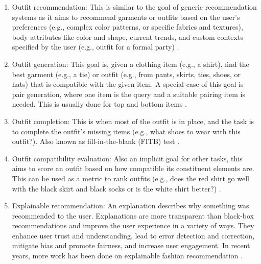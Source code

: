 		\begin{enumerate}
			\item Outfit recommendation: This is similar to the goal of generic recommendation systems as it aims to recommend garments or outfits based on the user's preferences (e.g., complex color patterns, or specific fabrics and textures), body attributes like color and shape, current trends, and custom contexts specified by the user (e.g., outfit for a formal party) \cite{DBLP:conf/sigir/LiW0CXC20, 9156794, 8932738, DBLP:conf/mm/HidayatiHCHFC18, DBLP:journals/tmm/ZhangJGZZLT17, DBLP:conf/waim/ShaWZFZY16}.
			\item Outfit generation: This goal is, given a clothing item (e.g., a shirt), find the best garment (e.g., a tie) or outfit (e.g., from pants, skirts, ties, shoes, or hats) that is compatible with the given item. A special case of this goal is pair generation, where one item is the query and a suitable pairing item is needed. This is usually done for top and bottom items \cite{9156535, 9893574, DBLP:conf/kdd/ChenHXGGSLPZZ19}.
			\item Outfit completion: This is when most of the outfit is in place, and the task is to complete the outfit's missing items (e.g., what shoes to wear with this outfit?). Also known as fill-in-the-blank (FITB) test \cite{9857004, DBLP:journals/corr/abs-2005-06584, DBLP:conf/mm/SongHLCXN19}.
			\item Outfit compatibility evaluation: Also an implicit goal for other tasks, this aims to score an outfit based on how compatible its constituent elements are. This can be used as a metric to rank outfits (e.g., does the red shirt go well with the black skirt and black socks or is the white shirt better?) \cite{DBLP:journals/eswa/MoZPW23, 10049142, DBLP:journals/eswa/BalimO23,9775146, DBLP:conf/iccvw/KimSMSSP21, DBLP:journals/ijon/SunHWZP20, DBLP:conf/sigir/DongWSDN20, DBLP:conf/www/YinL0019, DBLP:conf/aaai/YangMLWC19}.
			\item Explainable recommendation: An explanation describes why something was recommended to the user. Explanations are more transparent than black-box recommendations and improve the user experience in a variety of ways. They enhance user trust and understanding, lead to error detection and correction, mitigate bias and promote fairness, and increase user engagement. In recent years, more work has been done on explainable fashion recommendation \cite{DBLP:journals/tomccap/YangSFWDN21, DBLP:journals/www/LiCH21, 9522737, DBLP:journals/tkde/LinRCRMR20, DBLP:conf/wacv/TangsengO20, DBLP:conf/ijcai/HouWCLZL19, DBLP:conf/sigir/ChenCXZ0QZ19}.
		\end{enumerate}
	
